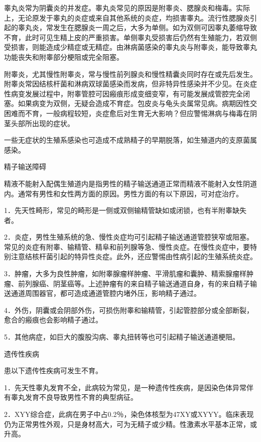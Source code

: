 \documentclass[12pt,UTF8]{ctexbook}
\begin{document}
睾丸炎常为阴囊炎的并发症。睾丸炎常见的原因是附睾炎、腮腺炎和梅毒。实际上，无论原发于睾丸的炎症或来自其他系统的炎症，均损害睾丸。流行性腮腺炎引起的睾丸炎，常发生在腮腺炎一周之后，大多为单侧。如为双侧可因睾丸萎缩导致不育，此时可见生精上皮的严重损害。单侧睾丸受损害后仍然有生殖能力，若双侧受损害，则能造成少精症或无精症。由淋病菌感染的睾丸炎与附睾炎，能导致睾丸功能丧失和附睾部分梗阻或完全阻塞。

附睾炎，尤其慢性附睾炎，常与慢性前列腺炎和慢性精囊炎同时存在或先后发生。附睾炎常因结核杆菌和淋病双球菌感染而发病，但非特异性感染并不少见。在炎症性病变发展过程中，附睾管腔可因瘢痕形成变细变窄，有可能发展成管腔完全闭塞。如果病变为双侧，无疑会造成不育症。包皮炎与龟头炎属常见病。病期因性交困难而不育，一般病程较短，炎症愈后对生育无大影响？但应警惕淋病与梅毒在阴茎头部所出现的症状。

一些无症状的生殖系感染也可造成不成熟精子的早期脱落，如生殖道内的支原菌属感染。





精子输送障碍


精液不能射入配偶生殖道内是指男性的精子输送通道正常而精液不能射入女性阴道内。通常有男性和女性两方面的原因。男性方面的有以下原因，可对症治疗。

1．先天性畸形，常见的畸形是一侧或双侧输精管缺如或闭锁，也有半附睾缺失者。

2．炎症，男性生殖系统的急、慢性炎症均可引起精子输送通道管腔狭窄或阻塞。常见的炎症有附睾、输精管、精阜和前列腺等急、慢性炎症。在慢性炎症中，要特别注意结核杆菌引起的特异性炎症。此外，还应警惕由性病引起的生殖系统炎症。

3．肿瘤，大多为良性肿瘤，如附睾腺瘤样肿瘤、平滑肌瘤和囊肿、精索腺瘤样肿瘤、前列腺癌、阴茎癌等。上述肿瘤有的来自精子输送通道自身，有的来自精子输送通道周围器官，都可造成通道管腔内堵外压，影响精子通过。

4．外伤，阴囊或会阴部外伤，可损伤附睾和输精管，引起管腔部分或全部断裂，愈合的瘢痕也会影响精子通过。

5．其他病症，如巨大的腹股沟病、睾丸扭转等也可引起精子输送通道梗阻。





遗传性疾病


患以下遗传性疾病可发生不育。

1．先天性睾丸发育不全，此病较为常见，是一种遗传性疾病，是因染色体异常伴有睾丸发育不良导致男性不育的典型病征。

2．XYY综合症，此病在男子中占0.2％，染色体核型为47XY或XYYY。临床表现仍为正常男性外观，只是身材高大，可为无精子或少精。性激素水平基本正常，或升高。
\end{document}
